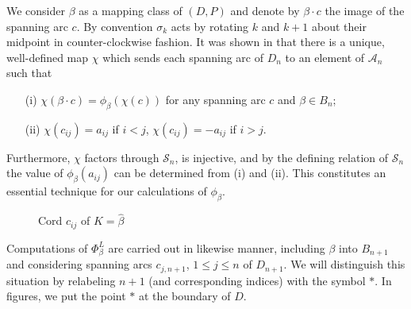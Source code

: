 \documentclass[11pt]{amsart}
\def\A{{\mathcal A}}
\def\s{{\sigma}}
\theoremstyle{definition}
\begin{document}
We consider $\beta$ as a mapping class of $(D,P)$ and denote by $\beta\cdot c$ the image of the spanning arc $c$. By convention $\s_k$ acts by rotating $k$ and $k+1$ about their midpoint in counter-clockwise fashion. It was shown in \cite[Section 2]{Ng05b} that there is a unique, well-defined map $\chi$ which sends each spanning arc of $D_n$ to an element of $\A_n$ such that 
    \begin{itemize}
      \item[(i)] $\chi(\beta\cdot c) = \phi_{\beta}(\chi(c))$ for any spanning arc $c$ and $\beta\in B_n$;
      \item[(ii)] $\chi(c_{ij})=a_{ij}$ if $i<j$, $\chi(c_{ij})=-a_{ij}$ if $i>j$.
    \end{itemize}
Furthermore, $\chi$ factors through $\mathscr S_n$, is injective, and by the defining relation of $\mathscr S_n$ the value of $\phi_{\beta}(a_{ij})$ can be determined from (i) and (ii). This constitutes an essential technique for our calculations of $\phi_\beta$.

    \begin{figure}[ht]
    \caption{Cord $c_{ij}$ of $K=\hat \beta$}
    \label{FigA_nGens}
    \end{figure} 
  Computations of $\Phi_\beta^L$ are carried out in likewise manner, including $\beta$ into $B_{n+1}$ and considering spanning arcs $c_{j,n+1}$, $1\le j\le n$ of $D_{n+1}$. We will distinguish this situation by relabeling $n+1$ (and corresponding indices) with the symbol $\ast$. In figures, we put the point $\ast$ at the boundary of $D$.
\end{document}
